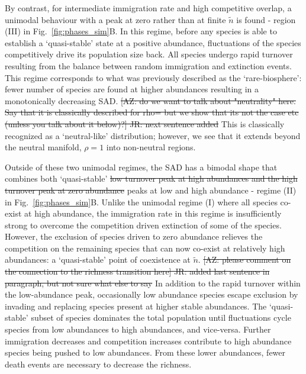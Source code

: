 \documentclass[9pt,twocolumn,twoside,lineno]{pnas-new}
\begin{document}
By contrast, for intermediate immigration rate %
and high competitive overlap, 
a unimodal behaviour with a peak at zero rather than at finite $\tilde{n}$ is found - region (III) in Fig.~\ref{fig:phases_sim}B. %
In this regime, before any species is able to establish a `quasi-stable' state at a positive abundance,  fluctuations of the species competitively drive its population size back.
All species undergo rapid turnover resulting from the balance between random immigration and extinction events. %
This regime corresponds to what was previously described as the `rare-biosphere': fewer number of species are found at higher abundances resulting in a monotonically decreasing SAD. 
\st{[AZ: do we want to talk about "neutrality" here. Say that it is classically described for rho= but we show that its not the case etc (unless you talk about it below)?] JR: next sentence added}
This is classically recognized as a `neutral-like' distribution; however, we see that it extends beyond the neutral manifold, $\rho=1$ into non-neutral regions.
 
Outside of these two unimodal regimes, the SAD has a bimodal shape that combines both `quasi-stable' \st{low turnover peak at high abundances and the high turnover peak at zero abundance} peaks at low and high abundance - regime (II) in Fig.~\ref{fig:phases_sim}B.
Unlike the unimodal regime (I) where all species co-exist at high abundance, %
the immigration rate in this regime is insufficiently strong to overcome the competition driven extinction of some of the species. %
However, the exclusion of species driven to zero abundance relieves the competition on the remaining species that can now co-exist at relatively high abundances: a `quasi-stable' point of coexistence at $\tilde{n}$. 
\st{[AZ: please comment on the connection to the richness transition here] JR: added last sentence in paragraph, but not sure what else to say}%
In addition to the rapid turnover within the low-abundance peak, occasionally low abundance species escape exclusion by invading and replacing species present at higher stable abundances. 
The `quasi-stable' subset of species dominates the total population %
until fluctuations cycle species from low abundances to high abundances, and vice-versa.
Further immigration decreases and competition increases contribute to high abundance species being pushed to low abundances. 
From these lower abundances, fewer death events are necessary to decrease the richness.
\end{document}
